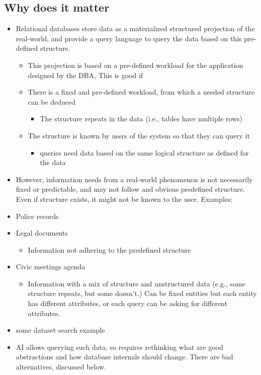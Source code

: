 \subsection{Why does it matter}
\begin{itemize}
    \item Relational databases store data as a materialized structured projection of the real-world, and provide a query language to query the data based on this pre-defined structure. 
    \begin{itemize}
        \item This projection is based on a pre-defined workload for the application designed by the DBA, This is good if
        \item  There is a fixed and pre-defined workload, from which a needed structure can be deduced
        \begin{itemize}
            \item The structure repeats in the data (i.e., tables have multiple rows)
        \end{itemize}
        \item The structure is known by users of the system so that they can query it
        \begin{itemize}
            \item queries need data based on the same logical structure as defined for the data
        \end{itemize}
        
    \end{itemize}
\end{itemize}
\begin{itemize}
\item However, information needs from a real-world phenomenon is not necessarily fixed or predictable, and may not follow and obvious predefined structure. Even if structure exists, it might not be known to the user. Examples:
    \item Police records
    \item Legal documents
    \begin{itemize}
        \item Information not adhering to the predefined structure
    \end{itemize}
    \item Civic meetings agenda
    \begin{itemize}
        \item Information with a mix of structure and unstructured data (e.g., some structure repeats, but some doesn’t.) Can be fixed entities but each entity has different attributes, or each query can be asking for different attributes. 
    \end{itemize}
    \item some dataset search example
    \item AI allows querying such data, so requires rethinking what are good abstractions and how database internals should change. There are bad alternatives, discussed below. 
\end{itemize}

